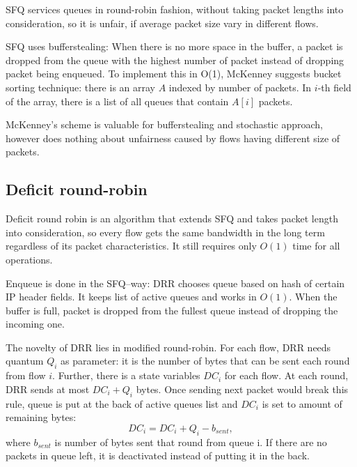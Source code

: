 SFQ services queues in round-robin fashion, without taking packet lengths into consideration, so it is unfair, if average packet size vary in different flows.

SFQ uses bufferstealing: When there is no more space in the buffer, a packet is dropped from the queue with the highest number of packet instead of dropping packet being enqueued. To implement this in O(1), McKenney suggests bucket sorting technique: there is an array $A$ indexed by number of packets. In $i$-th field of the array, there is a list of all queues that contain $A[i]$ packets.

McKenney's scheme is valuable for bufferstealing and stochastic approach, however does nothing about unfairness caused by flows having different size of packets.

\subsection{Deficit round-robin}

Deficit round robin \cite{EffDRR} is an algorithm that extends SFQ and takes packet length into consideration, so every flow gets the same bandwidth in the long term regardless of its packet characteristics. It still requires only $O(1)$ time for all operations.

Enqueue is done in the SFQ--way: DRR chooses queue based on hash of certain IP header fields. It keeps list of active queues and works in $O(1)$. When the buffer is full, packet is dropped from the fullest queue instead of dropping the incoming one.

The novelty of DRR lies in modified round-robin. For each flow, DRR needs quantum $Q_i$ as parameter: it is the number of bytes that can be sent each round from flow $i$. Further, there is a state variables $DC_i$ for each flow. At each round, DRR sends at most $DC_i + Q_i$ bytes. Once sending next packet would break this rule, queue is put at the back of active queues list and $DC_i$ is set to amount of remaining bytes:
\[
  DC_i = DC_i + Q_i - b_{sent},
\]
where $b_{sent}$ is number of bytes sent that round from queue i. If there are no packets in queue left, it is deactivated instead of putting it in the back.

